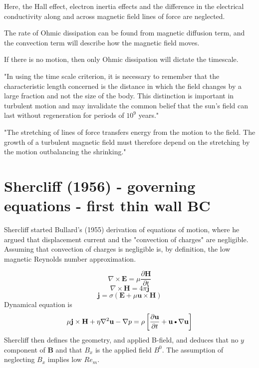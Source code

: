 \documentclass[11pt]{article}
\newcommand{\B}{\mathbf{B}}
\renewcommand{\H}{\mathbf{H}}
\newcommand{\U}{\mathbf{u}}
\newcommand{\SI}{\sigma}
\newcommand{\curl}{\nabla \times}
\newcommand{\PD}{\partial}
\newcommand{\J}{\mathbf{j}}
\newcommand{\E}{\mathbf{E}}
\newcommand{\DOT}{\text{\textbullet}}
\begin{document}
Here, the Hall effect, electron inertia effects and the difference in the electrical conductivity along and across magnetic field lines of force are neglected.

The rate of Ohmic dissipation can be found from magnetic diffusion term, and the convection term will describe how the magnetic field moves.

If there is no motion, then only Ohmic dissipation will dictate the timescale.

"In using the time scale criterion, it is necessary to remember that the characteristic length concerned is the distance in which the field changes by a large fraction and not the size of the body. This distinction is important in turbulent motion and may invalidate the common belief that the sun's field can last without regeneration for periods of $10^9$ years." 

"The stretching of lines of force transfers energy from the motion to the field. The growth of a turbulent magnetic field must therefore depend on the stretching by the motion outbalancing the shrinking." 

\newpage

\section{Shercliff (1956) - governing equations - first thin wall BC}

Shercliff started Bullard's (1955) derivation of equations of motion, where he argued that displacement current and the "convection of charges" are negligible. Assuming that convection of charges is negligible is, by definition, the low magnetic Reynolds number approximation.

\begin{equation}
  \curl \E = \mu \frac{\PD \H}{\PD t}
\end{equation}
\begin{equation}
	\curl \H = 4 \pi \J
\end{equation}
\begin{equation}
	\J = \SI (\E + \mu \U \times \H)
\end{equation}
Dynamical equation is
\begin{equation}
	\mu \J \times \H + \eta \nabla^2 \U - \nabla p = \rho \left[ \frac{\PD \U}{\PD t} + \U \DOT \nabla \U \right]
\end{equation}
Shercliff then defines the geometry, and applied B-field, and deduces that no $y$ component of $\B$ and that $B_x$ is the applied field $B^0$. The assumption of neglecting $B_x$ implies low $Re_m$.
\end{document}
